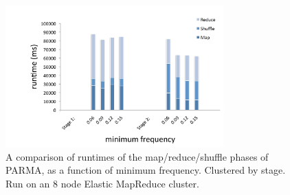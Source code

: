 \begin{figure}[htb]
  \centering
    \includegraphics[width=0.75\textwidth]{parma/frequency}
  \caption{A comparison of runtimes of the map/reduce/shuffle phases
of PARMA, as a function of minimum frequency. Clustered by stage. Run
on an 8 node Elastic MapReduce cluster.}
\label{fig:parmafrequency}
\end{figure}

